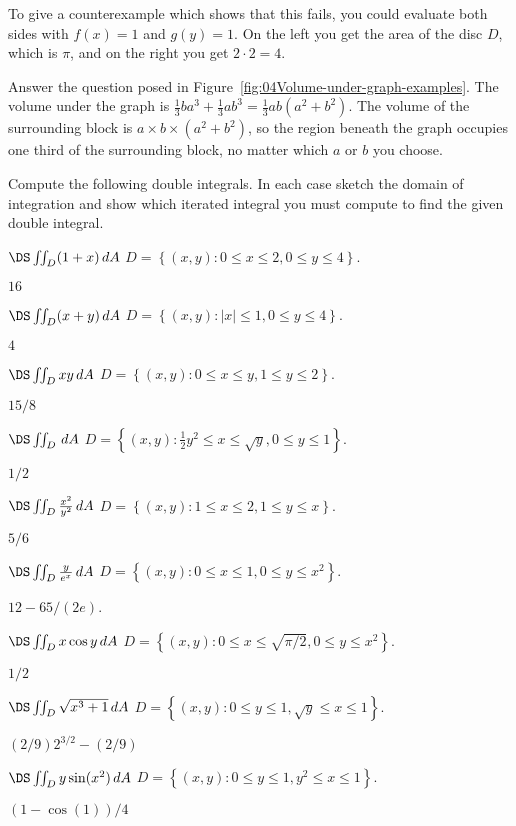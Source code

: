 To give a counterexample which shows that this fails, you could evaluate both sides with $f(x) = 1$ and $g(y)=1$.  On the left you get the area of the disc $D$, which is $\pi$, and on the right you get $2\cdot2=4$.
\endanswer


\problem Answer the question posed in
Figure~\ref{fig:04Volume-under-graph-examples}.
\answer
The volume under the graph is
$\frac13 ba^3 + \frac13 ab^3 = \frac 13 ab(a^2+b^2)$.
The volume of the surrounding block is $a\times b\times (a^2+b^2)$, so
the region beneath the graph occupies one third of the surrounding
block, no matter which $a$ or $b$ you choose.
\endanswer


\problem Compute the following double integrals.  
In each case sketch the domain of integration and
show which iterated integral you must compute to find the given double
integral.

\noindent\parbox{0.8\textwidth}{%
\subprob $\DS \iint_D (1+x) \,dA $
\hfill$D = \left\{ (x,y) : 0\leq x\leq 2, 0\leq y\leq 4 \right\}$.
}
\answer
$16$
\endanswer

\noindent\parbox{0.8\textwidth}{%
\subprob $\DS \iint_D (x+y)\,dA $ 
\hfill$D = \left\{ (x,y) : |x|\leq1, 0\leq y\leq 4 \right\}$.
}
\answer
$4$
\endanswer


\noindent\parbox{0.8\textwidth}{%
\subprob $\DS \iint_D xy \,dA $ 
\hfill$D = \left\{ (x,y) : 0\le x\le y, 1\le y \le 2 \right\}$.
}
\answer
$15/8$
\endanswer


\noindent\parbox{0.8\textwidth}{%
\subprob $\DS \iint_{D} \,dA $ 
\hfill$D = \left\{ (x,y) : \tfrac12y^2\le x\le \sqrt{y}, 0\le y\le 1 \right\}$.
}
\answer
$1/2$
\endanswer


\noindent\parbox{0.8\textwidth}{%
\subprob $\DS \iint_{D} {x^2\over y^2}\,dA $ 
\hfill$D = \left\{ (x,y) : 1\le x\le2, 1\le y\le x \right\}$.
}
\answer
$5/6$
\endanswer


\noindent\parbox{0.8\textwidth}{%
\subprob $\DS \iint_D {y\over e^x}\,dA $ 
\hfill$D = \left\{ (x,y) : 0\le x\le1, 0\le y\le x^2 \right\}$.
}
\answer
$12-65/(2e)$.
\endanswer


\noindent\parbox{0.8\textwidth}{%
\subprob $\DS \iint_D x\cos y\,dA $ 
\hfill$D = \left\{ (x,y) : 0\le x\le \sqrt{\pi/2}, 0\le y\le x^2 \right\}$.
}
\answer
$1/2$
\endanswer


\noindent\parbox{0.8\textwidth}{%
\subprob  $\DS \iint_D  
\sqrt{x^3+1}\,dA $
\hfill$D = \left\{ (x,y) : 0\le y\le 1, \surd y\le x\le 1 \right\}$.
}
\answer
$(2/9)2^{3/2}-(2/9)$
\endanswer

\noindent\parbox{0.8\textwidth}{%
\subprob $\DS \iint_D   y\sin(x^2)\,dA $
\hfill$D = \left\{ (x,y) : 0\le y\le 1, y^2\le x\le 1 \right\}$.
}
\answer
$(1-\cos(1))/4$
\endanswer

